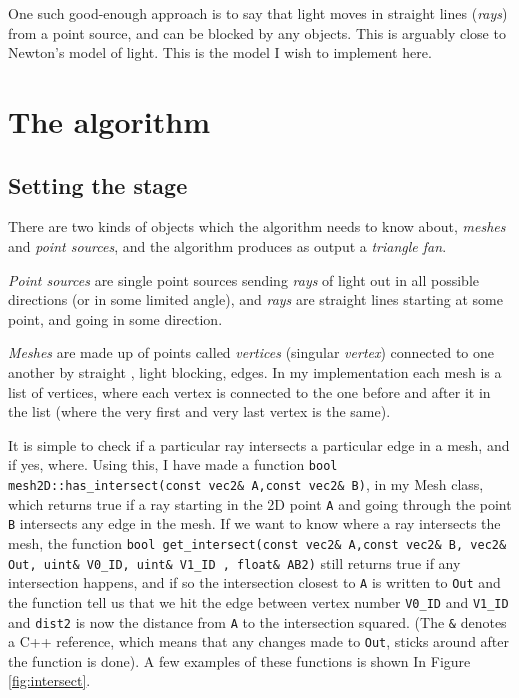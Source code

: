 \documentclass[a4paper,12pt,article]{memoir}
\begin{document}
One such good-enough approach is to say that light moves in straight lines (\textit{rays}) from a point source, and can be blocked by any objects. This is arguably close to Newton's model of light. This is the model I wish to implement here.

\chapter{The algorithm}

\section{Setting the stage}
There are two kinds of objects which the algorithm needs to know about, \textit{meshes} and \textit{point sources}, and the algorithm produces as output a \textit{triangle fan}.

\textit{Point sources} are single point sources sending \textit{rays} of light out in all possible directions (or in some limited angle), and \textit{rays} are straight lines starting at some point, and going in some direction.

\textit{Meshes} are made up of points called \textit{vertices} (singular \textit{vertex}) connected to one another by straight , light blocking, edges. In my implementation each mesh is a list of vertices, where each vertex is connected to the one before and after it in the list (where the very first and very last vertex is the same).

It is simple to check if a particular ray intersects a particular edge in a mesh, and if yes, where. Using this, I have made a function \lstinline{bool mesh2D::has_intersect(const vec2& A,const vec2& B)}, in my Mesh class, which returns true if a ray starting in the 2D point \lstinline{A} and going through the point \lstinline{B} intersects any edge in the mesh. If we want to know where a ray intersects the mesh, the function \lstinline{bool get_intersect(const vec2& A,const vec2& B, vec2& Out, uint& V0_ID, uint& V1_ID , float& AB2)} still returns true if any intersection happens, and if so the intersection closest to \lstinline{A} is written to \lstinline{Out} and the function tell us that we hit the edge between vertex number \lstinline{V0_ID} and \lstinline{V1_ID} and \lstinline{dist2} is now the distance from \lstinline{A} to the intersection squared. (The \lstinline{&} denotes a C++ reference, which means that any changes made to \lstinline{Out}, sticks around after the function is done). A few examples of these functions is shown In Figure \ref{fig:intersect}.
\end{document}
